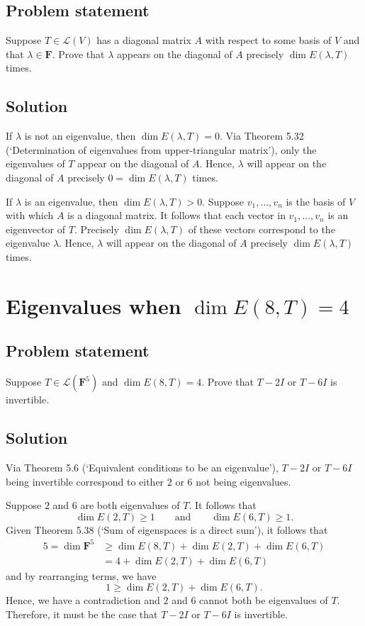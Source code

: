 \documentclass{article}
\begin{document}
\subsection*{Problem statement}
Suppose $T\in\mathcal{L}(V)$ has a diagonal matrix $A$ with respect to some basis of $V$ and that $\lambda\in\mathbf{F}$.
Prove that $\lambda$ appears on the diagonal of $A$ precisely $\dim E(\lambda,T)$ times.

\subsection*{Solution}
If $\lambda$ is not an eigenvalue, then $\dim E(\lambda,T)=0$. 
Via Theorem 5.32 (`Determination of eigenvalues from upper-triangular matrix'), only the eigenvalues of $T$ appear on the diagonal of $A$. 
Hence, $\lambda$ will appear on the diagonal of $A$ precisely $0=\dim E(\lambda,T)$ times.

If $\lambda$ is an eigenvalue, then $\dim E(\lambda,T)>0$. 
Suppose $v_1,\ldots,v_n$ is the basis of $V$ with which $A$ is a diagonal matrix. 
It follows that each vector in $v_1,\ldots,v_n$ is an eigenvector of $T$. 
Precisely $\dim E(\lambda,T)$ of these vectors correspond to the eigenvalue $\lambda$. 
Hence, $\lambda$ will appear on the diagonal of $A$ precisely $\dim E(\lambda,T)$ times.

\clearpage

\section{Eigenvalues when $\dim E(8,T)=4$}
\subsection*{Problem statement}
Suppose $T\in\mathcal{L}(\mathbf{F}^5)$ and $\dim E(8,T)=4$. 
Prove that $T-2I$ or $T-6I$ is invertible.

\subsection*{Solution}
Via Theorem 5.6 (`Equivalent conditions to be an eigenvalue'), $T-2I$ or $T-6I$ being invertible correspond to either $2$ or $6$ not being eigenvalues. 

Suppose $2$ and $6$ are both eigenvalues of $T$. 
It follows that 
\[\dim E(2,T)\geq 1\qquad\text{and}\qquad\dim E(6,T)\geq 1.\]
Given Theorem 5.38 (`Sum of eigenspaces is a direct sum'), it follows that
\begin{align*}
    5=\dim \mathbf{F}^5 &\geq \dim E(8,T)+\dim E(2,T)+\dim E(6,T)\\
    &=4+\dim E(2,T)+\dim E(6,T)
\end{align*}
and by rearranging terms, we have
\[1\geq\dim E(2,T) + \dim E(6,T).\]
Hence, we have a contradiction and $2$ and $6$ cannot both be eigenvalues of $T$. 
Therefore, it must be the case that $T-2I$ or $T-6I$ is invertible.
\end{document}
